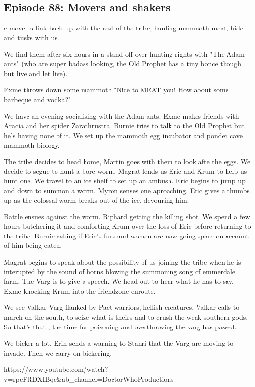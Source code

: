 \subsection{Episode 88: Movers and shakers}

e move to link back up with the rest of the tribe, hauling mammoth meat, hide and tusks with us.\medskip

We find them after six hours in a stand off over hunting rights with "The Adam-ants" (who are super badass looking, the Old Prophet has a tiny bonce though but live and let live).\medskip

Exme throws down some mammoth "Nice to MEAT you! How about some barbeque and vodka?"\medskip

We have an evening socialising with the Adam-ants. Exme makes friends with Aracia and her spider Zarathrustra. Burnie tries to talk to the Old Prophet but he's having none of it. We set up the mammoth egg incubator and ponder cave mammoth biology.\medskip

The tribe decides to head home, Martin goes with them to look afte the eggs. We decide to segue to hunt a bore worm. Magrat lends us Eric and Krum to help us hunt one. We travel to an ice shelf to set up an ambush. Eric begins to jump up and down to summon a worm. Myron senses one aproaching. Eric gives a thumbs up as the colossal worm breaks out of the ice, devouring him.\medskip

Battle ensues against the worm. Riphard getting the killing shot. We spend a few hours butchering it and comforting Krum over the loss of Eric before returning to the tribe. Burnie asking if Eric's furs and women are now going spare on account of him being eaten.\medskip

Magrat begins to speak about the possibility of us joining the tribe when he is interupted by the sound of horns blowing the summoning song of emmerdale farm. The Varg is to give a speech. We head out to hear what he has to say. Exme knocking Krum into the friendzone enroute.\medskip

We see Valkar Varg flanked by Pact warriors, hellish creatures. Valkar calls to march on the south, to seize what is theirs and to crush the weak southern gods. So that's that , the time for poisoning and overthrowing the varg has passed.\medskip

We bicker a lot. Erin sends a warning to Stanri that the Varg are moving to invade. Then we carry on bickering.\medskip

https://www.youtube.com/watch?v=rpcFRDXIBqc\&ab\_channel=DoctorWhoProductions\medskip

\vspace*{5mm}
